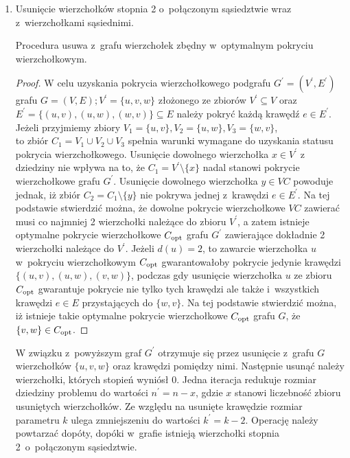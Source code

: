 \begin{enumerate}
  \item Usunięcie wierzchołków stopnia 2 o~połączonym sąsiedztwie wraz z~wierzchołkami sąsiednimi.   
    \begin{theorem}
      Procedura usuwa z~grafu wierzchołek zbędny w~optymalnym pokryciu wierzchołkowym.
    \end{theorem}
    \begin{proof}
      W celu uzyskania pokrycia wierzchołkowego podgrafu $G^\prime=(V^\prime,E^\prime)$
      grafu $G=(V,E); V^\prime=\{u, v, w\}$ złożonego ze zbiorów $ V^\prime \subseteq V$ oraz $E^\prime=\{(u,v), (u,w), (w,v)\} \subseteq E$ należy pokryć każdą krawędź $e \in E^\prime$.\\ 
      Jeżeli przyjmiemy zbiory ${V_1=\{u,v\}, V_2=\{u,w\}, V_3=\{w,v\}}$,\\ 
      to zbiór ${C_1=V_1 \cup V_2 \cup V_3}$ spełnia warunki wymagane do uzyskania 
      statusu pokrycia wierzchołkowego.
      Usunięcie dowolnego wierzchołka $x \in V^\prime$ z dziedziny nie wpływa na to, że 
      ${C_1=V^\prime \setminus \{x\}}$ nadal stanowi pokrycie wierzchołkowe grafu $G^\prime$.
      Usunięcie dowolnego wierzchołka $y \in VC$ powoduje jednak, iż zbiór
      $C_2=C_1 \setminus \{y\}$ nie pokrywa jednej z~krawędzi $e \in E^\prime$.
      Na tej podstawie stwierdzić można, że dowolne pokrycie wierzchołkowe
      $VC$ zawierać musi co najmniej 2 wierzchołki należące do zbioru $V^\prime$, a zatem
      istnieje optymalne pokrycie wierzchołkowe $C_{\textnormal{opt}}$ grafu $G^\prime$
      zawierające dokładnie 2 wierzchołki należące do $V^\prime$.
      Jeżeli $d(u)=2$, to zawarcie wierzchołka $u$ w~pokryciu wierzchołkowym $C_{\textnormal{opt}}$ gwarantowałoby pokrycie jedynie krawędzi
      $\{(u,v), (u,w), (v,w)\}$, podczas gdy usunięcie wierzchołka $u$ ze zbioru $C_{\textnormal{opt}}$ gwarantuje 
      pokrycie nie tylko tych krawędzi ale także i~wszystkich krawędzi $e \in E$ przystających do $\{w, v\}$.
      Na tej podstawie stwierdzić można, iż istnieje takie optymalne pokrycie wierzchołkowe $C_{\textnormal{opt}}$ grafu $G$, że $\{v,w\} \in C_{\textnormal{opt}}$.
    \end{proof}
    W związku z~powyższym graf $G^\prime$ otrzymuje się przez usunięcie z~grafu
    $G$ wierzchołków $\{u,v,w\}$ oraz krawędzi pomiędzy nimi.
    Następnie usunąć należy wierzchołki, których stopień wyniósł 0.
    Jedna iteracja redukuje rozmiar dziedziny problemu do wartości
    $n^\prime=n-x$, gdzie $x$ stanowi liczebność zbioru usuniętych wierzchołków.
    Ze względu na usunięte krawędzie rozmiar parametru $k$ ulega zmniejszeniu 
    do wartości $k^\prime=k-2$.
    Operację należy powtarzać dopóty, dopóki w~grafie istnieją wierzchołki stopnia 2\
    o~połączonym sąsiedztwie.


\end{enumerate}
